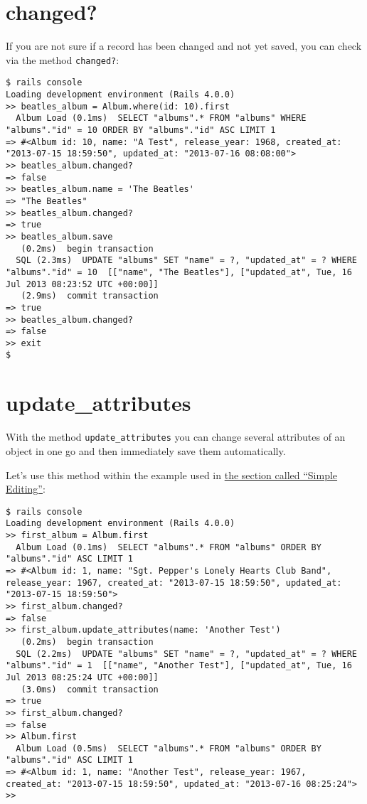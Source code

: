 \documentclass[a4paper]{book}
\newcommand{\chap}[1]{\newpage\thispagestyle{empty}\chapter{#1}\label{chap:\thechapter}}
\begin{document}
\chap{changed?}\label{changed}

If you are not sure if a record has been changed and not yet saved, you can check via the method \texttt{changed?}:

\begin{shaded}\begin{verbatim}
$ rails console
Loading development environment (Rails 4.0.0)
>> beatles_album = Album.where(id: 10).first
  Album Load (0.1ms)  SELECT "albums".* FROM "albums" WHERE "albums"."id" = 10 ORDER BY "albums"."id" ASC LIMIT 1
=> #<Album id: 10, name: "A Test", release_year: 1968, created_at: "2013-07-15 18:59:50", updated_at: "2013-07-16 08:08:00">
>> beatles_album.changed?
=> false
>> beatles_album.name = 'The Beatles'
=> "The Beatles"
>> beatles_album.changed?
=> true
>> beatles_album.save
   (0.2ms)  begin transaction
  SQL (2.3ms)  UPDATE "albums" SET "name" = ?, "updated_at" = ? WHERE "albums"."id" = 10  [["name", "The Beatles"], ["updated_at", Tue, 16 Jul 2013 08:23:52 UTC +00:00]]
   (2.9ms)  commit transaction
=> true
>> beatles_album.changed?
=> false
>> exit
$
\end{verbatim}\end{shaded}

\chap{update\_attributes}\label{updateux5fattributes}

With the method \texttt{update\_attributes} you can change several attributes of an object in one go and then immediately save them automatically.

Let's use this method within the example used in \hyperref[activerecordux5feinfachesux5feditieren]{the section called “Simple Editing”}:

\begin{shaded}\begin{verbatim}
$ rails console
Loading development environment (Rails 4.0.0)
>> first_album = Album.first
  Album Load (0.1ms)  SELECT "albums".* FROM "albums" ORDER BY "albums"."id" ASC LIMIT 1
=> #<Album id: 1, name: "Sgt. Pepper's Lonely Hearts Club Band", release_year: 1967, created_at: "2013-07-15 18:59:50", updated_at: "2013-07-15 18:59:50">
>> first_album.changed?
=> false
>> first_album.update_attributes(name: 'Another Test')
   (0.2ms)  begin transaction
  SQL (2.2ms)  UPDATE "albums" SET "name" = ?, "updated_at" = ? WHERE "albums"."id" = 1  [["name", "Another Test"], ["updated_at", Tue, 16 Jul 2013 08:25:24 UTC +00:00]]
   (3.0ms)  commit transaction
=> true
>> first_album.changed?
=> false
>> Album.first
  Album Load (0.5ms)  SELECT "albums".* FROM "albums" ORDER BY "albums"."id" ASC LIMIT 1
=> #<Album id: 1, name: "Another Test", release_year: 1967, created_at: "2013-07-15 18:59:50", updated_at: "2013-07-16 08:25:24">
>>
\end{verbatim}\end{shaded}
\end{document}
